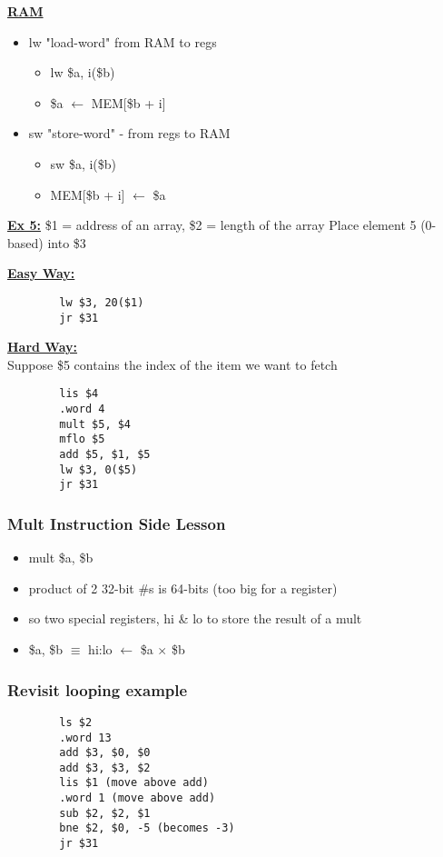 \documentclass[12pt]{article}
\newcommand{\myt}[1]{\textbf{\underline{#1}}}
\begin{document}
	\myt{RAM}\\
	\begin{itemize}
		\item lw "load-word" from RAM to regs
		\begin{itemize}
			\item lw \$a, i(\$b)
			\item \$a $\leftarrow$ MEM[\$b + i]
		\end{itemize}
		\item sw "store-word" - from regs to RAM
		\begin{itemize}
			\item sw \$a, i(\$b)
			\item MEM[\$b + i] $\leftarrow$ \$a
		\end{itemize}
	\end{itemize}
	
	\myt{Ex 5:} \$1 = address of an array, \$2 = length of the array
	Place element 5 (0-based) into \$3
	
	\myt{Easy Way:}\\
	\lstset{language=[mips]Assembler}
	\begin{lstlisting}
		lw $3, 20($1)
		jr $31
	\end{lstlisting}
	
	\myt{Hard Way:}\\
	Suppose \$5 contains the index of the item we want to fetch\\
	
	\lstset{language=[mips]Assembler}
	\begin{lstlisting}
		lis $4
		.word 4
		mult $5, $4
		mflo $5
		add $5, $1, $5
		lw $3, 0($5)
		jr $31
	\end{lstlisting}
	
	\subsubsection*{Mult Instruction Side Lesson}
	\begin{itemize}
		\item mult \$a, \$b
		\item product of 2 32-bit \#s is 64-bits (too big for a register)
		\item so two special registers, hi \& lo to store the result of a mult
		\item \$a, \$b $\equiv$ hi:lo $\leftarrow$ \$a $\times$ \$b
	\end{itemize}
	
	\subsubsection*{Revisit looping example}
	\lstset{language=[mips]Assembler}
	\begin{lstlisting}
		ls $2
		.word 13
		add $3, $0, $0
		add $3, $3, $2
		lis $1 (move above add)
		.word 1 (move above add)
		sub $2, $2, $1
		bne $2, $0, -5 (becomes -3)
		jr $31
	\end{lstlisting}
	
\end{document}
